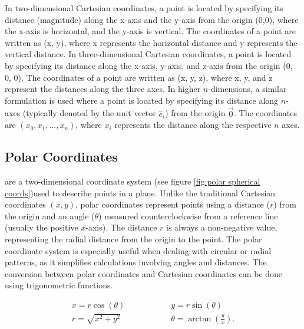 In two-dimensional Cartesian coordinates, a point is located by specifying its distance (magnitude) along the x-axis and the y-axis from the origin (0,0), where the x-axis is horizontal, and the y-axis is vertical. The coordinates of a point are written as (x, y), where x represents the horizontal distance and y represents the vertical distance. In three-dimensional Cartesian coordinates, a point is located by specifying its distance along the x-axis, y-axis, and z-axis from the origin (0, 0, 0). The coordinates of a point are written as (x, y, z), where x, y, and z represent the distances along the three axes. In higher $n$-dimensions, a similar formulation is used where a point is located by specifying its distance along $n$-axes (typically denoted by the unit vector $\hat{e}_i$) from the origin $\vec{0}$. The coordinates are $(x_0,x_1,...,x_n)$, where $x_i$ represents the distance along the respective $n$ axes.


\subsection{Polar Coordinates}

 are a two-dimensional coordinate system  (see figure \ref{fig:polar spherical coords})used to describe points in a plane. Unlike the traditional Cartesian coordinates $(x, y)$, polar coordinates represent points using a distance ($r$) from the origin and an angle ($\theta$) measured counterclockwise from a reference line (usually the positive $x$-axis). The distance $r$ is always a non-negative value, representing the radial distance from the origin to the point. The polar coordinate system is especially useful when dealing with circular or radial patterns, as it simplifies calculations involving angles and distances. The conversion between polar coordinates and Cartesian coordinates can be done using trigonometric functions.

\begin{align}
	x = r\cos(\theta) &\hspace{2cm} y = r\sin(\theta) \\
	 r = \sqrt{x^2 + y^2} &\hspace{2cm} \theta = \arctan\left(\frac{y}{x}\right).
\end{align}

